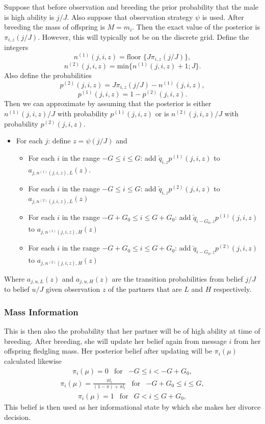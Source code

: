 \documentclass[10pt]{article}
\begin{document}
Suppose that before observation and breeding the prior probability
that the male is high ability is $j/J$. Also suppose that observation
strategy $\psi$ is used. After breeding the mass of offspring is
$M=m_{i}$. Then the exact value of the posterior is $\pi{}_{i,z}(j/J)$.
However, this will typically not be on the discrete grid. Define the
integers 
\[
n^{(1)}(j,i,z)=\text{floor }\{J\pi{}_{i,z}(j/J)\},
\]
\[
n^{(2)}(j,i,z)=\text{min}\{n^{(1)}(j,i,z)+1;J\}.
\]
Also define the probabilities
\[
p^{(2)}(j,i,z)=J\pi{}_{i,z}(j/J)-n^{(1)}(j,i,z),
\]
\[
p^{(1)}(j,i,z)=1-p^{(2)}(j,i,z).
\]
Then we can approximate by assuming that the posterior is either $n^{(1)}(j,i,z)/J$
with probability $p^{(1)}(j,i,z)$ or is $n^{(2)}(j,i,z)/J$ with
probability $p^{(2)}(j,i,z)$. 
\begin{itemize}
	\item For each $j$: define $z=\psi(j/J)$ and
	\begin{itemize}
		\item For each $i$ in the range $-G\leq i\leq G$: add $\check{q}_{i,z}p^{(1)}(j,i,z)$
		to $a_{j,n^{(1)}(j,i,z),L}(z)$. 
		\item For each $i$ in the range $-G\leq i\leq G$: add $\check{q}_{i,z}p^{(2)}(j,i,z)$
		to $a_{j,n^{(2)}(j,i,z),L}(z)$
		\item For each $i$ in the range $-G+G_{0}\leq i\leq G+G_{0}$: add $\check{q}_{i-G_{0},z}p^{(1)}(j,i,z)$
		to $a_{j,n^{(1)}(j,i,z),H}(z)$ 
		\item For each $i$ in the range $-G+G_{0}\leq i\leq G+G_{0}$: add $\check{q}_{i-G_{0},z}p^{(2)}(j,i,z)$
		to $a_{j,n^{(2)}(j,i,z),H}(z)$
	\end{itemize}
\end{itemize}
Where $a_{j,u,L}(z)$ and $a_{j,u,H}(z)$ are the transition probabilities
from belief $j/J$ to belief $u/J$ given observation $z$ of the
partners that are $L$ and $H$ respectively.

\subsubsection{Mass Information}

This is then also the probability that her partner will be of high
ability at time of breeding. After breeding, she will update her belief
again from message $i$ from her offspring fledgling mass. Her posterior
belief after updating will be $\pi_{i}(\mu)$ calculated likewise
\[
\begin{array}{ccc}
	\pi{}_{i}(\mu)=0 & \text{for} & -G\leq i<-G+G_{0},\end{array}
\]
\[
\begin{array}{ccc}
	\pi{}_{i}(\mu)=\frac{\pi l_{i}}{(1-\pi)+\pi l_{i}} & \text{for} & -G+G_{0}\leq i\leq G,\end{array}
\]
\[
\begin{array}{ccc}
	\pi{}_{i}(\mu)=1 & \text{for} & G<i\leq G+G_{0},\end{array}
\]
This belief is then used as her informational state by which she makes
her divorce decision.
\end{document}
